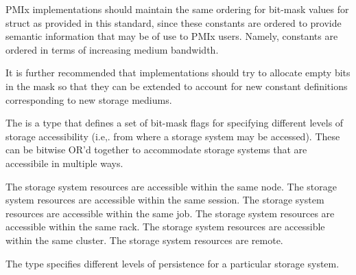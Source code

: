 \adviceimplstart
PMIx implementations should maintain the same ordering for bit-mask values for  struct as provided in this standard, since these constants are ordered to provide semantic information that may be of use to PMIx users. Namely,  constants are ordered in terms of increasing medium bandwidth.

It is further recommended that implementations should try to allocate empty bits in the mask so that they can be extended to account for new constant definitions corresponding to new storage mediums.
\adviceimplend


The  is a  type that defines a set of bit-mask flags for specifying different levels of storage accessibility (i.e,. from where a storage system may be accessed). These can be bitwise OR'd together to accommodate storage systems that are accessibile in multiple ways.

\begin{constantdesc}
%
The storage system resources are accessible within the same node.
%
The storage system resources are accessible within the same session.
%
The storage system resources are accessible within the same job.
%
The storage system resources are accessible within the same rack.
%
The storage system resources are accessible within the same cluster.
%
The storage system resources are remote.
%
\end{constantdesc}


The  type specifies different levels of persistence for a particular storage system.

